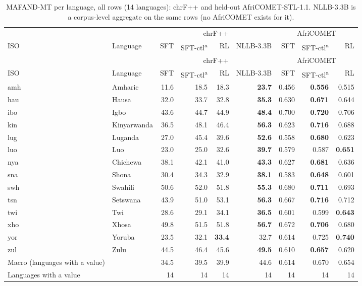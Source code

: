 {\scriptsize\setlength{\tabcolsep}{2pt}\renewcommand{\arraystretch}{0.95}
\begin{longtable}{@{}llrrrrrrr@{}}
\caption{MAFAND-MT per language, all rows (14 languages): chrF++ and held-out AfriCOMET-STL-1.1. NLLB-3.3B is a corpus-level aggregate on the same rows (no AfriCOMET exists for it).}\label{tab:fr-mf-merged}\\
\toprule
& & \multicolumn{4}{c}{chrF++} & \multicolumn{3}{c}{AfriCOMET} \\
\cmidrule(lr){3-6}\cmidrule(lr){7-9}
ISO & Language & SFT & SFT-ctl\textsuperscript{a} & RL & NLLB-3.3B & SFT & SFT-ctl\textsuperscript{a} & RL \\
\midrule\endfirsthead
\toprule
& & \multicolumn{4}{c}{chrF++} & \multicolumn{3}{c}{AfriCOMET} \\
\cmidrule(lr){3-6}\cmidrule(lr){7-9}
ISO & Language & SFT & SFT-ctl\textsuperscript{a} & RL & NLLB-3.3B & SFT & SFT-ctl\textsuperscript{a} & RL \\
\midrule\endhead
\midrule\endfoot
\bottomrule\endlastfoot
amh & Amharic & 11.6 & 18.5 & 18.3 & \textbf{23.7} & 0.456 & \textbf{0.556} & 0.515 \\
hau & Hausa & 32.0 & 33.7 & 32.8 & \textbf{35.3} & 0.630 & \textbf{0.671} & 0.644 \\
ibo & Igbo & 43.6 & 44.7 & 44.9 & \textbf{48.4} & 0.700 & \textbf{0.720} & 0.706 \\
kin & Kinyarwanda & 36.5 & 48.1 & 46.4 & \textbf{56.3} & 0.623 & \textbf{0.716} & 0.688 \\
lug & Luganda & 27.0 & 45.4 & 39.6 & \textbf{52.6} & 0.558 & \textbf{0.680} & 0.623 \\
luo & Luo & 23.0 & 25.0 & 32.6 & \textbf{39.7} & 0.579 & 0.587 & \textbf{0.651} \\
nya & Chichewa & 38.1 & 42.1 & 41.0 & \textbf{43.3} & 0.627 & \textbf{0.681} & 0.636 \\
sna & Shona & 30.4 & 34.3 & 32.9 & \textbf{38.1} & 0.583 & \textbf{0.648} & 0.601 \\
swh & Swahili & 50.6 & 52.0 & 51.8 & \textbf{55.3} & 0.680 & \textbf{0.711} & 0.693 \\
tsn & Setswana & 43.9 & 51.0 & 53.1 & \textbf{56.3} & 0.667 & \textbf{0.716} & 0.712 \\
twi & Twi & 28.6 & 29.1 & 34.1 & \textbf{36.5} & 0.601 & 0.599 & \textbf{0.643} \\
xho & Xhosa & 49.8 & 51.5 & 51.8 & \textbf{56.7} & 0.672 & \textbf{0.706} & 0.680 \\
yor & Yoruba & 23.5 & 32.1 & \textbf{33.4} & 32.7 & 0.614 & 0.725 & \textbf{0.740} \\
zul & Zulu & 44.5 & 46.4 & 45.6 & \textbf{49.5} & 0.610 & \textbf{0.657} & 0.620 \\
\midrule
Macro (languages with a value) &  & 34.5 & 39.5 & 39.9 & 44.6 & 0.614 & 0.670 & 0.654 \\
Languages with a value &  & 14 & 14 & 14 & 14 & 14 & 14 & 14 \\
\end{longtable}}


